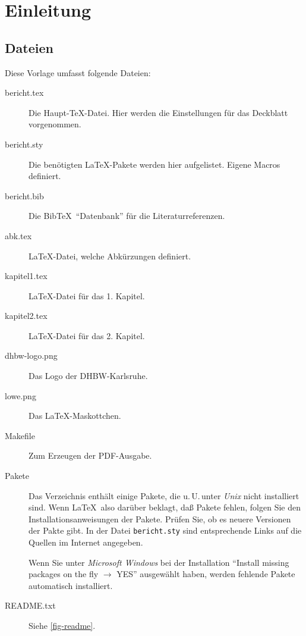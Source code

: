 
\chapter{Einleitung}

\section{Dateien}
Diese Vorlage umfasst folgende Dateien:
\begin{description}
\item[bericht.tex] Die Haupt-\TeX-Datei. Hier werden die Einstellungen für das
     Deckblatt vorgenommen.
\item[bericht.sty] Die benötigten \LaTeX-Pakete werden hier aufgelistet. Eigene Macros definiert.
\item[bericht.bib] Die Bib\TeX\ "`Datenbank"' für die Literaturreferenzen.
\item[abk.tex] \LaTeX-Datei, welche Abkürzungen definiert.
\item[kapitel1.tex] \LaTeX-Datei für das 1. Kapitel.
\item[kapitel2.tex] \LaTeX-Datei für das 2. Kapitel.
\item[dhbw-logo.png] Das Logo der DHBW-Karlsruhe.
\item[lowe.png] Das \LaTeX-Maskottchen.
\item[Makefile] Zum Erzeugen der PDF-Ausgabe.
\item[Pakete] Das Verzeichnis enthält einige Pakete, die u.\,U.\,unter \emph{Unix} nicht installiert
     sind. Wenn \LaTeX\ also darüber beklagt, daß Pakete fehlen, folgen Sie den Installationsanweisungen
     der Pakete. Prüfen Sie, ob es neuere Versionen der Pakte gibt. In der Datei
     \texttt{bericht.sty} sind entsprechende Links auf die Quellen im Internet angegeben.

     Wenn Sie unter \emph{Microsoft Windows} bei der Installation
     \enquote{Install missing packages on the fly $\longrightarrow$ YES} ausgewählt haben,
     werden fehlende Pakete automatisch installiert.
\item[README.txt] Siehe \cref{fig-readme}.
\end{description}

